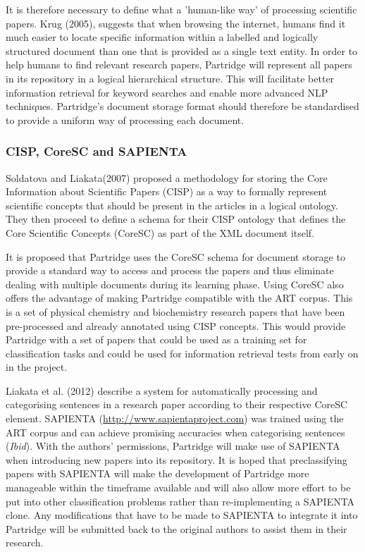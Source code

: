 \documentclass[12pt,a4paper]{article}
\begin{document}
It is therefore necessary to define what a 'human-like way' of processing
scientific papers.  Krug (2005), suggests that when browsing the internet,
humans find it much easier to locate specific information within a labelled and
logically structured document than one that is provided as a single text
entity\cite{Krug:2005:DMM:1051204}. In order to help humans to find relevant
research papers, Partridge will represent all papers in its repository in a
logical hierarchical structure. This will facilitate better information
retrieval for keyword searches and enable more advanced NLP techniques.
Partridge's document storage format should therefore be standardised to provide
a uniform way of processing each document. 

\subsubsection{CISP, CoreSC and SAPIENTA}

Soldatova and Liakata(2007) proposed a methodology for storing the Core
Information about Scientific Papers (CISP) as a way to formally represent
scientific concepts that should be present in the articles in a logical
ontology\cite{soldatova2007ontology}. They then proceed to define a schema for
their CISP ontology that defines the Core Scientific Concepts (CoreSC) as part
of the XML document itself\cite{liakata2008guidelines}. 

It is proposed that Partridge uses the CoreSC schema for document storage
to provide a standard way to access and process the papers and thus
eliminate dealing with multiple documents during its learning phase. 
Using CoreSC also offers the advantage of making Partridge compatible
with the ART corpus. This is a set of physical chemistry and biochemistry
research papers that have been pre-processed and already annotated using CISP
concepts\cite{liakataART}. This would provide Partridge with a set of papers
that could be used as a training set for classification tasks and could be used
for information retrieval tests from early on in the project.

Liakata et al. (2012) describe a system for automatically processing and
categorising sentences in a research paper according to their respective CoreSC
element\cite{citeulike:10444769}. SAPIENTA
(\url{http://www.sapientaproject.com}) was trained using the ART corpus and can
achieve promising accuracies when categorising sentences (\emph{Ibid}). With
the authors' permissions, Partridge will make use of SAPIENTA when introducing
new papers into its repository. It is hoped that preclassifying papers with
SAPIENTA will make the development of Partridge more manageable within the
timeframe available and will also allow more effort to be put into other
classification problems rather than re-implementing a SAPIENTA clone. Any
modifications that have to be made to SAPIENTA to integrate it into Partridge
will be submitted back to the original authors to assist them in their research.
\end{document}

